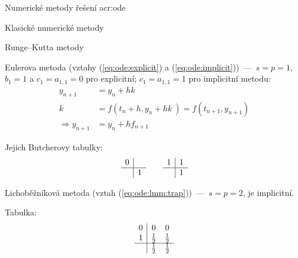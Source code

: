 \documentclass[thesis=M,czech]{FITthesis}[2012/06/26]
\newcommand{\acrlabel}[1]{acr:#1}
\newcommand{\acr}[1]{\acrshort{\acrlabel{#1}}}
\newcommand{\rf}[1]{\ref{#1}}
\newcommand{\rfeq}[1]{(\rf{eq:#1})}
\begin{document}
\begin{section}{Numerické metody řešení \acr{ode}}
\begin{subsection}{Klasické numerické metody}
\begin{subsubsection}{Runge--Kutta metody}
\begin{paragraph}{Eulerova metoda}\label{sss:search:ode:classic:rk:euler}
(vztahy \rfeq{ode:explicit}
a \rfeq{ode:implicit})~---~${s = p = 1}$,
${b_{1} = 1}$ a
${c_{1} = a_{1,1} = 0}$ pro explicitní;
${c_{1} = a_{1,1} = 1}$ pro implicitní metodu:
\begin{equation*}
\begin{split}
   y_{n+1}             &= y_{n} + h k~\\
   k~&= f \! \left( t_{n} + h, y_{n} + h k~\right)
      = f \! \left( t_{n+1}, y_{n+1} \right) \\
   \Rightarrow y_{n+1} &= y_{n} + h f_{n+1}
\end{split}
\end{equation*}

Jejich Butcherovy tabulky:
\begin{equation*}
\begin{array}{r|c}
   0  &   \\ \hline
      & 1
\end{array}
\qquad
\begin{array}{r|c}
   1  & 1 \\ \hline
      & 1
\end{array}
\end{equation*}
\end{paragraph} %


\begin{paragraph}{Lichoběžníková metoda}
\label{sss:search:ode:classic:rk:trap}
(vztah \rfeq{ode:lmm:trap})~---~${s = p = 2}$, je implicitní.

Tabulka:
\begin{equation*}
\begin{array}{r|cc}
   0  &           0 &           0 \\
   1  & \frac{1}{2} & \frac{1}{2} \\ \hline
      & \frac{1}{2} & \frac{1}{2}
\end{array}
\end{equation*}
\end{paragraph} %



\end{subsubsection}
\end{subsection}
\end{section}
\end{document}
